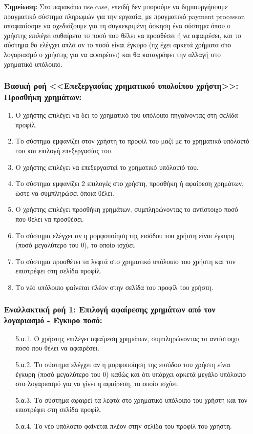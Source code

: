 \documentclass[12pt,a4paper]{article}
\begin{document}
\textbf{Σημείωση:} Στο παρακάτω use case, επειδή δεν μπορούμε να δημιουργήσουμε πραγματικό σύστημα πληρωμών για την εργασία, με πραγματικό payment processor, αποφασίσαμε να σχεδιάζουμε για τη συγκεκριμένη άσκηση ένα σύστημα όπου ο χρήστης επιλέγει αυθαίρετα το ποσό που θέλει να προσθέσει ή να αφαιρέσει, και το σύστημα θα ελέγχει απλά αν το ποσό είναι έγκυρο (πχ έχει αρκετά χρήματα στο λογαριασμό ο χρήστης για να αφαιρέσει) και θα καταγράφει την αλλαγή στο χρηματικό υπόλοιπο.


\subsubsection*{Βασική ροή <<Επεξεργασίας χρηματικού υπολοίπου χρήστη>>: Προσθήκη χρημάτων:}
\begin{enumerate}
    \item Ο χρήστης επιλέγει να δει το χρηματικό του υπόλοιπο πηγαίνοντας στη σελίδα προφίλ.
    \item Το σύστημα εμφανίζει στον χρήστη το προφίλ του μαζί με το χρηματικό υπόλοιπό του και επιλογή επεξεργασίας του.
    \item Ο χρήστης επιλέγει να επεξεργαστεί το χρηματικό υπόλοιπό του.
    \item Το σύστημα εμφανίζει 2 επιλογές στο χρήστη, προσθήκη ή αφαίρεση χρημάτων, ώστε να συμπληρώσει όποια θέλει.
    \item Ο χρήστης επιλέγει προσθήκη χρημάτων, συμπληρώνοντας το αντίστοιχο ποσό που θέλει να προσθέσει.
    \item Το σύστημα ελέγχει αν η μορφοποίηση της εισόδου του χρήστη είναι έγκυρη (ποσό μεγαλύτερο του 0), το οποίο ισχύει.
    \item Το σύστημα προσθέτει τα λεφτά στο χρηματικό υπόλοιπο του χρήστη και τον επιστρέφει στη σελίδα προφίλ.
    \item Το νέο υπόλοιπο φαίνεται πλέον στην σελίδα του προφίλ του χρήστη.
\end{enumerate}

\subsubsection*{Εναλλακτική ροή 1: Επιλογή αφαίρεσης χρημάτων από τον λογαριασμό - Έγκυρο ποσό:}
\begin{enumerate}
    \item [5.α.1.] Ο χρήστης επιλέγει αφαίρεση χρημάτων, συμπληρώνοντας το αντίστοιχο ποσό που θέλει να αφαιρέσει.
    \item [5.α.2.] Το σύστημα ελέγχει αν η μορφοποίηση της εισόδου του χρήστη είναι έγκυρη (ποσό μεγαλύτερο του 0) καθώς και ότι υπάρχει αρκετά μεγάλο υπόλοιπο στο λογαριασμό για να γίνει η αφαίρεση, το οποίο ισχύει.
    \item [5.α.3.] Το σύστημα αφαιρεί τα λεφτά στο χρηματικό υπόλοιπο του χρήστη και τον επιστρέφει στη σελίδα προφίλ.
    \item [5.α.4.] Το νέο υπόλοιπο φαίνεται πλέον στην σελίδα του προφίλ του χρήστη.
\end{enumerate}
\end{document}
